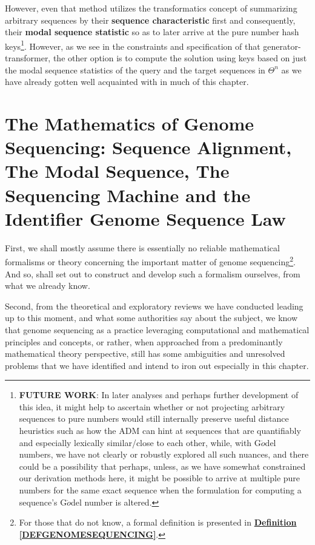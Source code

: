 \documentclass[a4paper, 18pt]{book} %
\begin{document}
   However, even that method utilizes the transformatics concept of summarizing arbitrary sequences by their \textbf{sequence characteristic} first and consequently, their \textbf{modal sequence statistic} so as to later arrive at the pure number hash keys\footnote{\textbf{FUTURE WORK}: In later analyses and perhaps further development of this idea, it might help to ascertain whether or not projecting arbitrary sequences to pure numbers would still internally preserve useful distance heuristics such as how the ADM can hint at sequences that are quantifiably and especially lexically similar/close to each other, while, with G$\ddot{o}$del numbers, we have not clearly or robustly explored all such nuances, and there could be a possibility that perhaps, unless, as we have somewhat constrained our derivation methods here, it might be possible to arrive at multiple pure numbers for the same exact sequence when the formulation for computing a sequence's  G$\ddot{o}$del number is altered.}. However, as we see in the constraints and specification of that generator-transformer, the other option is to compute the solution using keys based on just the modal sequence statistics of the query and the target sequences in $\Theta^n$ as we have already gotten well acquainted with in much of this chapter.



\chapter{The Mathematics of Genome Sequencing: Sequence Alignment, The Modal Sequence, The Sequencing Machine and the Identifier Genome Sequence Law}
\label{SECMATHSEQ}



First, we shall mostly assume there is essentially no reliable mathematical formalisms or theory concerning the important matter of genome sequencing\footnote{For those that do not know, a formal definition is presented in \textbf{\hyperref[DEFGENOMESEQUENCING]{Definition \ref{DEFGENOMESEQUENCING}}}.}. And so, shall set out to construct and develop such a formalism ourselves, from what we already know.

Second, from the theoretical and exploratory reviews we have conducted leading up to this moment, and what some authorities\cite{przytycka_wgs_lecture10} say about the subject, we know that genome sequencing as a practice leveraging computational and mathematical principles and concepts, or rather, when approached from a predominantly mathematical theory perspective, still has some ambiguities and unresolved problems that we have identified and intend to iron out especially in this chapter.
\end{document}
